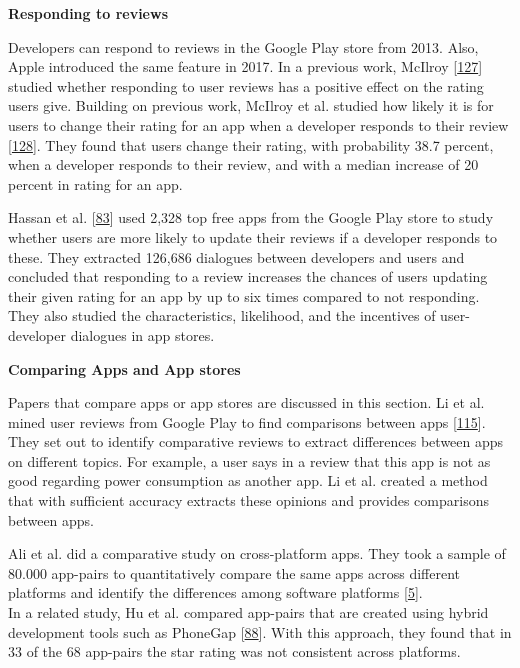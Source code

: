 \documentclass[]{book}
\begin{document}
\textbf{Responding to reviews}

Developers can respond to reviews in the Google Play store from 2013.
Also, Apple introduced the same feature in 2017. In a previous work,
McIlroy {[}\protect\hyperlink{ref-mcilroy2014empirical}{127}{]} studied
whether responding to user reviews has a positive effect on the rating
users give. Building on previous work, McIlroy et al. studied how likely
it is for users to change their rating for an app when a developer
responds to their review
{[}\protect\hyperlink{ref-mcilroy2017worth}{128}{]}. They found that
users change their rating, with probability 38.7 percent, when a
developer responds to their review, and with a median increase of 20
percent in rating for an app.

Hassan et al. {[}\protect\hyperlink{ref-hassan2018studying}{83}{]} used
2,328 top free apps from the Google Play store to study whether users
are more likely to update their reviews if a developer responds to
these. They extracted 126,686 dialogues between developers and users and
concluded that responding to a review increases the chances of users
updating their given rating for an app by up to six times compared to
not responding. They also studied the characteristics, likelihood, and
the incentives of user-developer dialogues in app stores.

\textbf{Comparing Apps and App stores}

Papers that compare apps or app stores are discussed in this section. Li
et al. mined user reviews from Google Play to find comparisons between
apps {[}\protect\hyperlink{ref-li2017mining}{115}{]}. They set out to
identify comparative reviews to extract differences between apps on
different topics. For example, a user says in a review that this app is
not as good regarding power consumption as another app. Li et al.
created a method that with sufficient accuracy extracts these opinions
and provides comparisons between apps.

Ali et al. did a comparative study on cross-platform apps. They took a
sample of 80.000 app-pairs to quantitatively compare the same apps
across different platforms and identify the differences among software
platforms {[}\protect\hyperlink{ref-ali2017same}{5}{]}.\\
In a related study, Hu et al. compared app-pairs that are created using
hybrid development tools such as PhoneGap
{[}\protect\hyperlink{ref-hu2018studying}{88}{]}. With this approach,
they found that in 33 of the 68 app-pairs the star rating was not
consistent across platforms.
\end{document}
